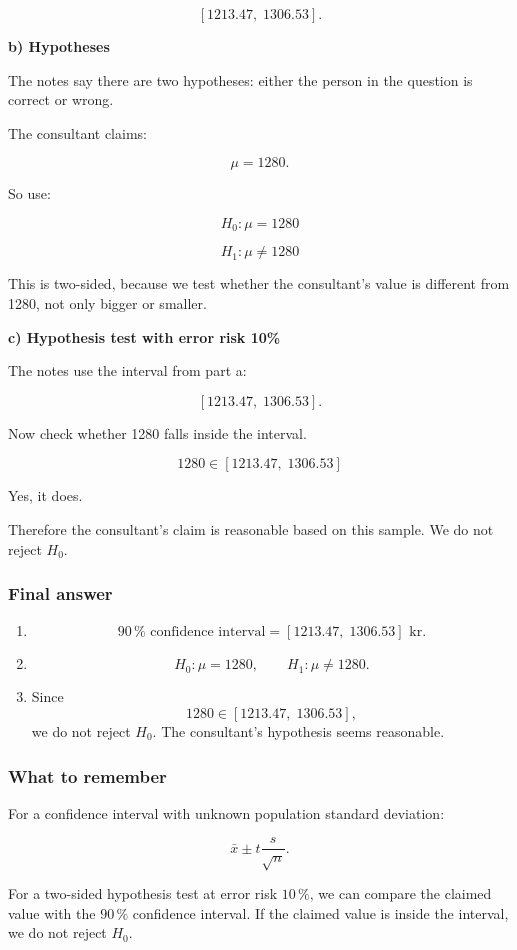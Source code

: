 \documentclass[10pt]{article}
\begin{document}
\[
[1213.47,\;1306.53].
\]

\textbf{b) Hypotheses}

The notes say there are two hypotheses:
either the person in the question is correct or wrong.

The consultant claims:

\[
\mu=1280.
\]

So use:

\[
H_0:\mu=1280
\]

\[
H_1:\mu\neq 1280
\]

This is two-sided, because we test whether the consultant's value is
different from 1280, not only bigger or smaller.

\textbf{c) Hypothesis test with error risk 10\%}

The notes use the interval from part a:

\[
[1213.47,\;1306.53].
\]

Now check whether 1280 falls inside the interval.

\[
1280\in [1213.47,\;1306.53]
\]

Yes, it does.

Therefore the consultant's claim is reasonable based on this sample.
We do not reject $H_0$.

\subsubsection*{Final answer}
\begin{enumerate}[label=\alph*)]
\item
\[
90\,\%\text{ confidence interval}
=
[1213.47,\;1306.53]\text{ kr}.
\]

\item
\[
H_0:\mu=1280,
\qquad
H_1:\mu\neq 1280.
\]

\item
Since
\[
1280\in [1213.47,\;1306.53],
\]
we do not reject $H_0$.
The consultant's hypothesis seems reasonable.
\end{enumerate}

\subsubsection*{What to remember}
For a confidence interval with unknown population standard deviation:

\[
\bar{x}\pm t\frac{s}{\sqrt{n}}.
\]

For a two-sided hypothesis test at error risk $10\,\%$,
we can compare the claimed value with the $90\,\%$ confidence interval.
If the claimed value is inside the interval, we do not reject $H_0$.
\end{document}
